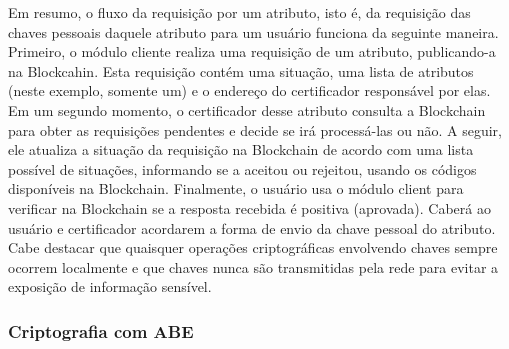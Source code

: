 \documentclass[a4paper,11pt]{article}
\begin{document}


Em resumo, o fluxo da requisição por um atributo, isto é, da requisição das chaves pessoais daquele atributo para um usuário funciona da seguinte maneira.
Primeiro, o módulo cliente realiza uma requisição de um atributo, publicando-a na Blockcahin.
Esta requisição contém uma situação, uma lista de atributos (neste exemplo, somente um) e o endereço do certificador responsável por elas.
Em um segundo momento, o certificador desse atributo consulta a Blockchain para obter as requisições pendentes e decide se irá processá-las ou não.
A seguir, ele atualiza a situação da requisição na Blockchain de acordo com uma lista possível de situações, informando se a aceitou ou rejeitou, usando os códigos disponíveis na Blockchain.
Finalmente, o usuário usa o módulo client para verificar na Blockchain se a resposta recebida é positiva (aprovada). Caberá ao usuário e certificador acordarem a forma de envio da chave pessoal do atributo.
Cabe destacar que quaisquer operações criptográficas envolvendo chaves sempre ocorrem localmente e que chaves nunca são transmitidas pela rede para evitar a exposição de informação sensível.

\subsubsection{Criptografia com ABE}

\end{document}
